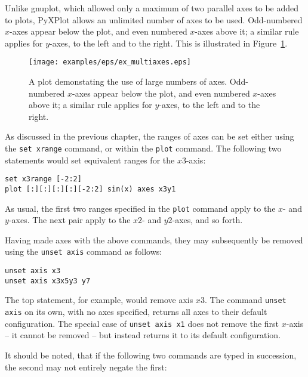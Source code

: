 Unlike gnuplot, which allowed only a maximum of two parallel axes to be added
to plots, PyXPlot allows an unlimited number of axes to be used. Odd-numbered
$x$-axes appear below the plot, and even numbered $x$-axes above it; a similar
rule applies for $y$-axes, to the left and to the right. This is illustrated in
Figure~\ref{fig:ex_multiaxes}.

\begin{figure}
\begin{center}
\texttt{[image: examples/eps/ex\_multiaxes.eps]}
\end{center}
\caption{A plot demonstating the use of large numbers of axes. Odd-numbered
$x$-axes appear below the plot, and even numbered $x$-axes above it; a similar
rule applies for $y$-axes, to the left and to the right.}
\label{fig:ex_multiaxes}
\end{figure}

As discussed in the previous chapter, the ranges of axes can be set either
using the \texttt{set xrange} command, or within the \texttt{plot} command. The following two
statements would set equivalent ranges for the $x3$-axis:

\begin{verbatim}
set x3range [-2:2]
plot [:][:][:][:][-2:2] sin(x) axes x3y1
\end{verbatim}

\noindent As usual, the first two ranges specified in the \texttt{plot} command
apply to the $x$- and $y$-axes. The next pair apply to the $x2$- and $y2$-axes,
and so forth.

\label{axis_removal} Having made axes with the above commands, they may
subsequently be removed using the \texttt{unset axis} command as follows:

\begin{verbatim}
unset axis x3
unset axis x3x5y3 y7
\end{verbatim}

\noindent The top statement, for example, would remove axis $x3$. The command
\texttt{unset axis} on its own, with no axes specified, returns all axes to
their default configuration.  The special case of \texttt{unset axis x1} does
not remove the first $x$-axis -- it cannot be removed -- but instead returns it
to its default configuration.

It should be noted, that if the following two commands are typed in succession,
the second may not entirely negate the first:

